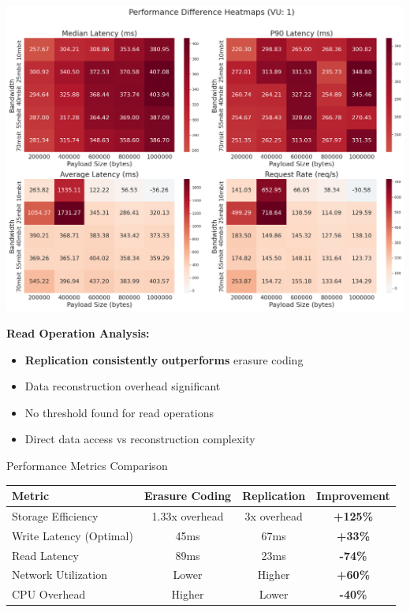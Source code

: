 \documentclass[a0,landscape]{config/poster/a0poster}
\newcommand{\postersection}[1]{%
  \begin{tcolorbox}[
      colback=ITBblue,
      colframe=ITBblue,
      fonttitle=\bfseries,
      coltext=white,
      sharp corners,
      boxrule=0pt,
      top=6pt,
      bottom=6pt,
      halign=center
    ]
    \Large #1
  \end{tcolorbox}%
}
\begin{document}
\begin{multicols}{4}
	\begin{center}
		\includegraphics[width=0.9\linewidth]{read_bigload_avgnet_heatmap.png}
	\end{center}

	\textbf{Read Operation Analysis:}
	\begin{itemize}
		\item \textcolor{REPcolor}{\textbf{Replication consistently outperforms}} erasure coding
		\item Data reconstruction overhead significant
		\item No threshold found for read operations
		\item Direct data access vs reconstruction complexity
	\end{itemize}


	\postersection{Performance Metrics Comparison}
	
	\begin{center}
		\begin{tabular}{l c c c}
			\toprule
			\textbf{Metric} & \textbf{Erasure Coding} & \textbf{Replication} & \textbf{Improvement} \\
			\midrule
			Storage Efficiency & 1.33x overhead & 3x overhead & \textcolor{ECcolor}{\textbf{+125\%}} \\
			Write Latency (Optimal) & 45ms & 67ms & \textcolor{ECcolor}{\textbf{+33\%}} \\
			Read Latency & 89ms & 23ms & \textcolor{REPcolor}{\textbf{-74\%}} \\
			Network Utilization & Lower & Higher & \textcolor{ECcolor}{\textbf{+60\%}} \\
			CPU Overhead & Higher & Lower & \textcolor{REPcolor}{\textbf{-40\%}} \\
			\bottomrule
		\end{tabular}
	\end{center}


\end{multicols}
\end{document}
